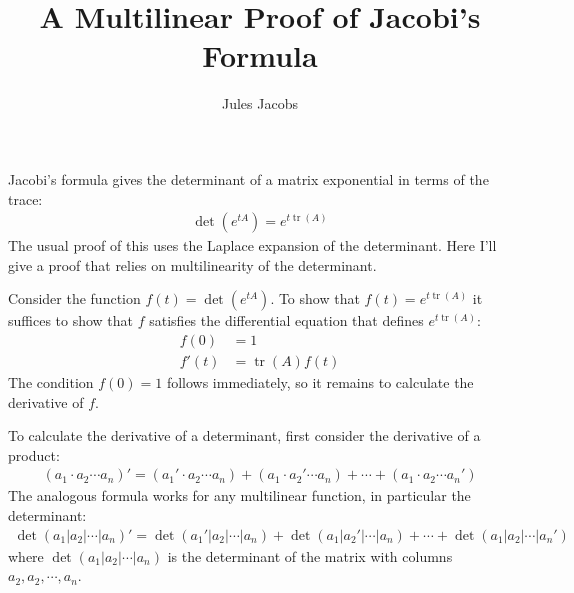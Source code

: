 

\newcommand{\tac}[1]{\lstinline[mathescape]~#1~}
\newcommand{\ciff}{\ \leftrightarrow\ }
\newcommand{\hyp}{\tac{H}}
\newcommand{\hypB}{\tac{G}}
\newcommand{\var}{\tac{x}}
\newcommand{\varB}{\tac{y}}

\newtheorem*{nlemma}{Lemma}

\DeclareMathOperator*{\tr}{tr}



\title{A Multilinear Proof of Jacobi's Formula}
\author{Jules Jacobs}


\maketitle

Jacobi's formula gives the determinant of a matrix exponential in terms of the trace:
\begin{align*}
  \det(e^{tA}) = e^{t\tr(A)}
\end{align*}
The usual proof of this uses the Laplace expansion of the determinant.
Here I'll give a proof that relies on multilinearity of the determinant.

Consider the function $f(t) = \det(e^{tA})$. To show that $f(t) = e^{t\tr(A)}$ it suffices to show that $f$ satisfies the differential equation that defines $e^{t\tr(A)}$:
\begin{align*}
  f(0) &= 1\\
  f'(t) &= \tr(A)f(t)
\end{align*}
The condition $f(0) = 1$ follows immediately, so it remains to calculate the derivative of $f$.

To calculate the derivative of a determinant, first consider the derivative of a product:
\begin{align*}
  (a_1 \cdot a_2 \cdots a_n)' = (a_1' \cdot a_2 \cdots a_n)
                              + (a_1 \cdot a_2' \cdots a_n)
                              + \cdots
                              + (a_1 \cdot a_2 \cdots a_n')
\end{align*}
The analogous formula works for any multilinear function, in particular the determinant:
\begin{align*}
  \det(a_1 | a_2 | \cdots |a_n)' = \det(a_1'| a_2 | \cdots | a_n)
                                 + \det(a_1 | a_2'| \cdots | a_n)
                                 + \cdots
                                 + \det(a_1 | a_2 | \cdots | a_n')
\end{align*}
where $\det(a_1 | a_2 | \cdots |a_n)$ is the determinant of the matrix with columns $a_2, a_2, \cdots, a_n$.

